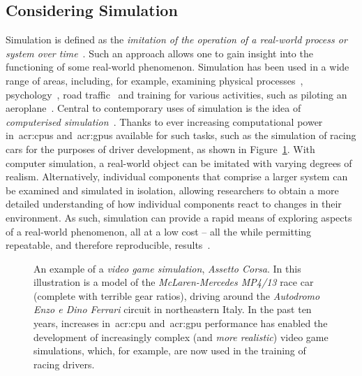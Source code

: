 \subsection{Considering Simulation}\label{sec:intro:simulation}
Simulation is defined as the \emph{imitation of the operation of a real-world process or system over time}~\citep{banks1996discrete}. Such an approach allows one to gain insight into the functioning of some real-world phenomenon. Simulation has been used in a wide range of areas, including, for example, examining physical processes~\citep{haessig1991physics_modelling}, psychology~\citep{hastie1988human_memory_simulation}, road traffic~\citep{mahmud2016traffic_modelling_electric} and training for various activities, such as piloting an aeroplane~\citep{sparko2010flight_simulators}. Central to contemporary uses of simulation is the idea of \emph{computerised simulation}~\citep{heermann1990computer_simulation}. Thanks to ever increasing computational power in~\glspl{acr:cpu} and~\glspl{acr:gpu} available for such tasks, such as the simulation of racing cars for the purposes of driver development, as shown in Figure~\ref{fig:ch1-mclaren}. With computer simulation, a real-world object can be imitated with varying degrees of realism. Alternatively, individual components that comprise a larger system can be examined and simulated in isolation, allowing researchers to obtain a more detailed understanding of how individual components react to changes in their environment. As such, simulation can provide a rapid means of exploring aspects of a real-world phenomenon, all at a low cost -- all the while permitting repeatable, and therefore reproducible, results~\citep{maxwell2016agents}.

\begin{figure}[t!]
    \centering
    \caption[Racing Simulator Example]{An example of a \emph{video game simulation}, \emph{Assetto Corsa}. In this illustration is a model of the \emph{McLaren-Mercedes MP4/13} race car (complete with terrible gear ratios), driving around the \emph{Autodromo Enzo e Dino Ferrari} circuit in northeastern Italy. In the past ten years, increases in~\gls{acr:cpu} and~\gls{acr:gpu} performance has enabled the development of increasingly complex (and \emph{more realistic}) video game simulations, which, for example, are now used in the training of racing drivers.}
    \label{fig:ch1-mclaren}
\end{figure}

